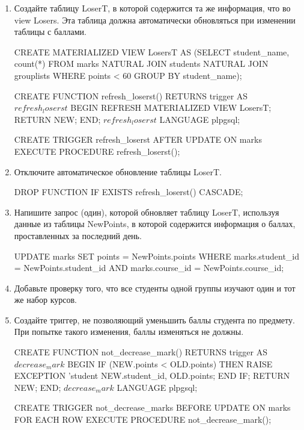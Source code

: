 \documentclass[10pt, a4paper]{article}
\begin{document}
\begin{enumerate}
	\item {Создайте таблицу \textsf{LoserT}, в которой содержится та же информация, что во view \textsf{Losers}. Эта таблица должна автоматически обновляться при изменении таблицы с баллами.

	\begin{sql}
CREATE MATERIALIZED VIEW LosersT AS
	(SELECT student_name, count(*) FROM
	marks NATURAL JOIN students NATURAL JOIN grouplists
		WHERE points < 60 GROUP BY student_name);

CREATE FUNCTION refresh_loserst() RETURNS trigger AS $refresh_loserst$ 
BEGIN
	REFRESH MATERIALIZED VIEW LosersT;
	RETURN NEW;
END; 
$refresh_loserst$ LANGUAGE plpgsql;

CREATE TRIGGER refresh_loserst AFTER UPDATE ON marks
	EXECUTE PROCEDURE refresh_loserst();
	\end{sql}
	}

	\item {Отключите автоматическое обновление таблицы \textsf{LoserT}.

	\begin{sql}
DROP FUNCTION IF EXISTS refresh_loserst() CASCADE;
	\end{sql}
	}

	\item {Напишите запрос (один), которой обновляет таблицу \textsf{LoserT}, используя данные из таблицы \textsf{NewPoints}, в которой содержится информация о баллах, проставленных за последний день.

\begin{sql}
UPDATE marks SET points = NewPoints.points
	WHERE marks.student_id = NewPoints.student_id
	AND marks.course_id = NewPoints.course_id;
\end{sql}
	}

	\item {Добавьте проверку того, что все студенты одной группы изучают один и тот же набор курсов.

\begin{sql}

\end{sql}
	}

	\item {Создайте триггер, не позволяющий уменьшить баллы студента по предмету. При попытке такого изменения, баллы изменяться не должны.

	\begin{sql}
CREATE FUNCTION not_decrease_mark() RETURNS trigger AS $decrease_mark$ 
BEGIN 
	IF (NEW.points < OLD.points) THEN	
		RAISE EXCEPTION 'student %
		NEW.student_id, OLD.points;
	END IF;
	RETURN NEW;
END; 
$decrease_mark$ LANGUAGE plpgsql;

CREATE TRIGGER not_decrease_marks BEFORE UPDATE ON marks
	FOR EACH ROW EXECUTE PROCEDURE not_decrease_mark();
	\end{sql}
	}

\end{enumerate}
\end{document}
